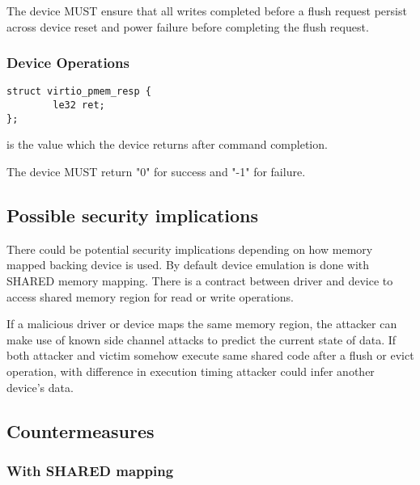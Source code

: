 The device MUST ensure that all writes completed before a flush request persist across device reset and power failure before completing the flush request.

\subsubsection{Device Operations}\label{sec:Device Types / PMEM Driver / Device Operation / Virtqueue return}
\begin{lstlisting}
struct virtio_pmem_resp {
        le32 ret;
};
\end{lstlisting}

 is the value which the device returns after command completion.


The device MUST return "0" for success and "-1" for failure.

\subsection{Possible security implications}\label{sec:Device Types / PMEM Device / Possible Security Implications}

There could be potential security implications depending on how
memory mapped backing device is used. By default device emulation
is done with SHARED memory mapping. There is a contract between driver
and device to access shared memory region for read or write operations.

If a malicious driver or device maps the same memory region, the attacker
can make use of known side channel attacks to predict the current state of data.
If both attacker and victim somehow execute same shared code after a flush
or evict operation, with difference in execution timing attacker could infer
another device's data.

\subsection{Countermeasures}\label{sec:Device Types / PMEM Device / Possible Security Implications / Countermeasures}

\subsubsection{With SHARED mapping}\label{sec:Device Types / PMEM Device / Possible Security Implications / Countermeasures / SHARED}

